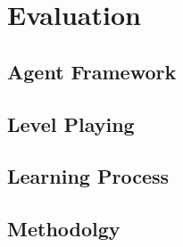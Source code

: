 
\section{Evaluation}


\subsection{Agent Framework}


\subsection{Level Playing}


\subsection{Learning Process}




\subsection{Methodolgy}